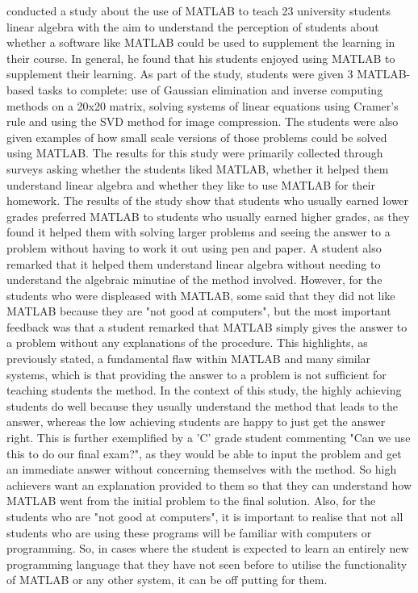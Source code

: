 \documentclass[natbib]{llncs}
\begin{document}
\cite{matlab} conducted a study about the use of MATLAB to teach 23 university students linear algebra with the aim to understand the perception of students about whether a software like MATLAB could be used to supplement the learning in their course. In general, he found that his students enjoyed using MATLAB to supplement their learning. As part of the study, students were given 3 MATLAB-based tasks to complete: use of Gaussian elimination and inverse computing methods on a 20x20 matrix, solving systems of linear equations using Cramer's rule and using the SVD method for image compression. The students were also given examples of how small scale versions of those problems could be solved using MATLAB. The results for this study were primarily collected through surveys asking whether the students liked MATLAB, whether it helped them understand linear algebra and whether they like to use MATLAB for their homework. The results of the study show that students who usually earned lower grades preferred MATLAB to students who usually earned higher grades, as they found it helped them with solving larger problems and seeing the answer to a problem without having to work it out using pen and paper. A student also remarked that it helped them understand linear algebra without needing to understand the algebraic minutiae of the method involved. However, for the students who were displeased with MATLAB, some said that they did not like MATLAB because they are "not good at computers", but the most important feedback was that a student remarked that MATLAB simply gives the answer to a problem without any explanations of the procedure. This highlights, as previously stated, a fundamental flaw within MATLAB and many similar systems, which is that providing the answer to a problem is not sufficient for teaching students the method. In the context of this study, the highly achieving students do well because they usually understand the method that leads to the answer, whereas the low achieving students are happy to just get the answer right. This is further exemplified by a 'C' grade student commenting "Can we use this to do our final exam?", as they would be able to input the problem and get an immediate answer without concerning themselves with the method. So high achievers want an explanation provided to them so that they can understand how MATLAB went from the initial problem to the final solution. Also, for the students who are "not good at computers", it is important to realise that not all students who are using these programs will be familiar with computers or programming. So, in cases where the student is expected to learn an entirely new programming language that they have not seen before to utilise the functionality of MATLAB or any other system, it can be off putting for them.
\end{document}
